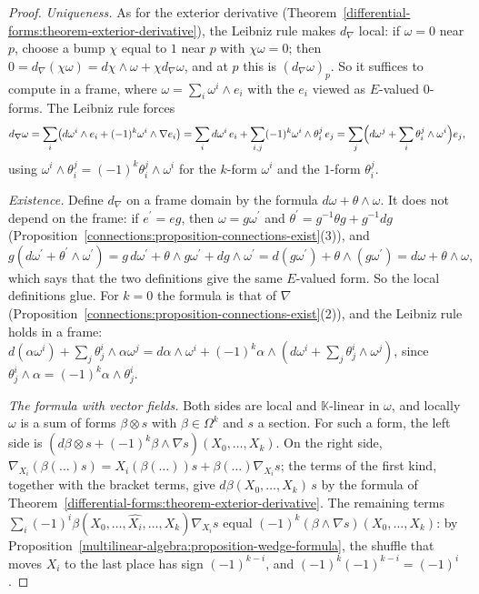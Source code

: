 \begin{proof}
\emph{Uniqueness.} As for the exterior derivative (Theorem~\ref{differential-forms:theorem-exterior-derivative}), the Leibniz rule makes $d_\nabla$ local: if $\omega = 0$ near $p$,
choose a bump $\chi$ equal to $1$ near $p$ with $\chi\omega = 0$; then $0 = d_\nabla(\chi\omega) = d\chi \wedge \omega + \chi d_\nabla\omega$, and at $p$ this is $(d_\nabla\omega)_p$. So it
suffices to compute in a frame, where $\omega = \sum_i\omega^i \wedge e_i$ with the $e_i$ viewed as $E$-valued $0$-forms. The Leibniz rule forces
\[
d_\nabla\omega = \sum_i\bigl(d\omega^i \wedge e_i + (-1)^k\omega^i \wedge \nabla e_i\bigr) = \sum_id\omega^i\,e_i + \sum_{i,j}(-1)^k\omega^i \wedge \theta^j_i\,e_j
= \sum_j\Bigl(d\omega^j + \sum_i\theta^j_i \wedge \omega^i\Bigr)e_j,
\]
using $\omega^i \wedge \theta^j_i = (-1)^k\theta^j_i \wedge \omega^i$ for the $k$-form $\omega^i$ and the $1$-form $\theta^j_i$.

\emph{Existence.} Define $d_\nabla$ on a frame domain by the formula $d\omega + \theta \wedge \omega$. It does not depend on the frame: if $e^{\prime} = eg$, then $\omega = g\omega^{\prime}$ and
$\theta^{\prime} = g^{-1}\theta g + g^{-1}dg$ (Proposition~\ref{connections:proposition-connections-exist}(3)), and
\[
g(d\omega^{\prime} + \theta^{\prime} \wedge \omega^{\prime}) = g\,d\omega^{\prime} + \theta \wedge g\omega^{\prime} + dg \wedge \omega^{\prime} = d(g\omega^{\prime}) + \theta \wedge (g\omega^{\prime}) = d\omega + \theta \wedge \omega,
\]
which says that the two definitions give the same $E$-valued form. So the local definitions glue. For $k = 0$ the formula is that of $\nabla$
(Proposition~\ref{connections:proposition-connections-exist}(2)), and the Leibniz rule holds in a frame: $d(\alpha\omega^i) + \sum_j\theta^i_j \wedge \alpha\omega^j
= d\alpha \wedge \omega^i + (-1)^k\alpha \wedge (d\omega^i + \sum_j\theta^i_j \wedge \omega^j)$, since $\theta^i_j \wedge \alpha = (-1)^k\alpha \wedge \theta^i_j$.

\emph{The formula with vector fields.} Both sides are local and $\mathbb{K}$-linear in $\omega$, and locally $\omega$ is a sum of forms $\beta \otimes s$ with $\beta \in \Omega^k$ and $s$ a
section. For such a form, the left side is $(d\beta \otimes s + (-1)^k\beta \wedge \nabla s)(X_0, \ldots, X_k)$. On the right side,
$\nabla_{X_i}(\beta(\ldots)s) = X_i(\beta(\ldots))s + \beta(\ldots)\nabla_{X_i}s$; the terms of the first kind, together with the bracket terms, give $d\beta(X_0, \ldots, X_k)\,s$ by the
formula of Theorem~\ref{differential-forms:theorem-exterior-derivative}. The remaining terms $\sum_i(-1)^i\beta(X_0, \ldots, \widehat{X_i}, \ldots, X_k)\nabla_{X_i}s$ equal
$(-1)^k(\beta \wedge \nabla s)(X_0, \ldots, X_k)$: by Proposition~\ref{multilinear-algebra:proposition-wedge-formula}, the shuffle that moves $X_i$ to the last place has sign
$(-1)^{k-i}$, and $(-1)^k(-1)^{k-i} = (-1)^i$.
\end{proof}

